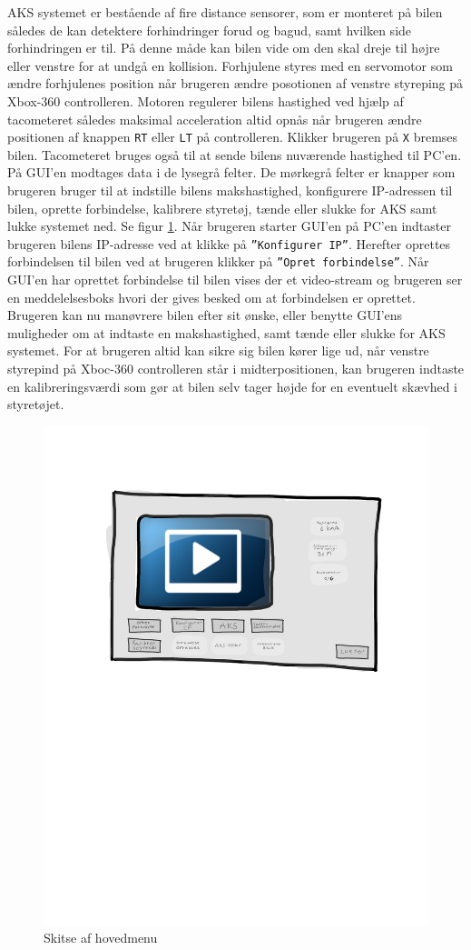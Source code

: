 AKS systemet er bestående af fire distance sensorer, som er monteret på bilen således de kan detektere forhindringer forud og bagud, samt hvilken side forhindringen er til. På denne måde kan bilen vide om den skal dreje til højre eller venstre for at undgå en kollision. Forhjulene styres med en servomotor som ændre forhjulenes position når brugeren ændre posotionen af venstre styreping på Xbox-360 controlleren. Motoren regulerer bilens hastighed ved hjælp af tacometeret således maksimal acceleration altid opnås når brugeren ændre positionen af knappen \texttt{RT} eller \texttt{LT} på controlleren. Klikker brugeren på \texttt{X} bremses bilen. Tacometeret bruges også til at sende bilens nuværende hastighed til PC'en. På GUI'en modtages data i de lysegrå felter. De mørkegrå felter er knapper som brugeren bruger til at indstille bilens makshastighed, konfigurere IP-adressen til bilen, oprette forbindelse, kalibrere styretøj, tænde eller slukke for AKS samt lukke systemet ned. Se figur \ref{fig:main_menu}. Når brugeren starter GUI'en på PC'en indtaster brugeren bilens IP-adresse ved at klikke på \texttt{''Konfigurer IP''}. Herefter oprettes forbindelsen til bilen ved at brugeren klikker på \texttt{''Opret forbindelse''}. Når GUI'en har oprettet forbindelse til bilen vises der et video-stream og brugeren ser en meddelelsesboks hvori der gives besked om at forbindelsen er oprettet. Brugeren kan nu manøvrere bilen efter sit ønske, eller benytte GUI'ens muligheder om at indtaste en makshastighed, samt tænde eller slukke for AKS systemet. For at brugeren altid kan sikre sig bilen kører lige ud, når venstre styrepind på Xboc-360 controlleren står i midterpositionen, kan brugeren indtaste en kalibreringsværdi som gør at bilen selv tager højde for en eventuelt skævhed i styretøjet.


\begin{figure}[h]
\centering
\includegraphics[width=\textwidth*2/3]{../fig/gui/hovedmenu}
\caption{Skitse af hovedmenu}
\label{fig:main_menu}
\end{figure}

